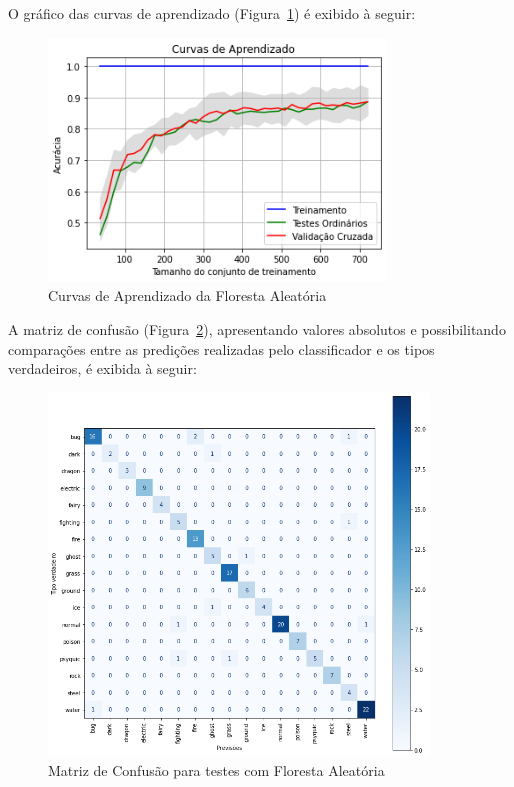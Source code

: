 \documentclass[12pt]{article}
\begin{document}
O gráfico das curvas de aprendizado (Figura~\ref{fig:exampleFig6}) é exibido à seguir:

\begin{figure}[H]
    \centering
    \includegraphics[width=0.8\textwidth]{Images/learning_curves_forest.png}
    \caption{Curvas de Aprendizado da Floresta Aleatória}
    \label{fig:exampleFig6}
\end{figure}

A matriz de confusão (Figura~\ref{fig:exampleFig7}), apresentando valores absolutos e possibilitando comparações entre as predições realizadas pelo classificador e os tipos verdadeiros, é exibida à seguir:

\begin{figure}[H]
    \centering
    \includegraphics[width=0.9\textwidth]{Images/confusion_matrix_forest.png}
    \caption{Matriz de Confusão para testes com Floresta Aleatória}
    \label{fig:exampleFig7}
\end{figure}
\end{document}
